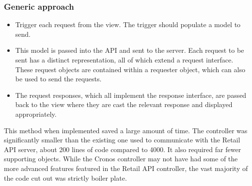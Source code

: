 \documentclass[a4paper, 11pt, titlepage]{article}
\begin{document}
\subsubsection{Generic approach}
\begin{itemize}
\item Trigger each request from the view. The trigger should populate a model to send. \label{cronos_generic_api}
\item This model is passed into the API and sent to the server. Each request to be sent has a distinct representation, all of which extend a request interface. These request objects are contained within a requester object, which can also be used to send the requests.
\item The request responses, which all implement the response interface, are passed back to the view where they are cast the relevant response and displayed appropriately.
\end{itemize}
This method when implemented saved a large amount of time. The controller was significantly smaller than the existing one used to communicate with the Retail API server, about 200 lines of code compared to 4000. It also required far fewer supporting objects. While the Cronos controller may not have had some of the more advanced features featured in the Retail API controller, the vast majority of the code cut out was strictly boiler plate.
\end{document}
